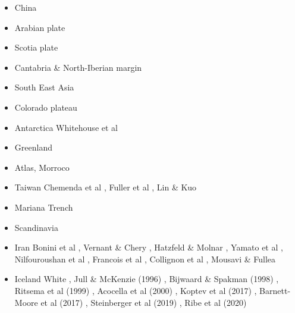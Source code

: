 \begin{itemize}
\item China 
{\scriptsize
\cite{zhst10}
\cite{wazh15}
\cite{guyr16}
\cite{dawl20}
}
\item Arabian plate 
{\scriptsize
\cite{rerl15}
}
\item Scotia plate 
{\scriptsize
\cite{necb13}
\cite{vaga20}
}
\item Cantabria \& North-Iberian margin 
{\scriptsize
\cite{clbb02}
\cite{peap15}
}
\item South East Asia 
{\scriptsize
\cite{rekv04}
\cite{yotr15}\cite{hasp15}\cite{meds15}
\cite{necg16}
}
\item Colorado plateau 
{\scriptsize
\cite{vabv10}
\cite{lesm11}
}
\item Antarctica  
{\scriptsize
\cite{huha07}
Whitehouse et al \cite{whbl12}
}
\item Greenland  
{\scriptsize
\cite{stsj15}\cite{heps15}\cite{stbl19}
}
\item Atlas, Morroco  
{\scriptsize
\cite{mica12}
\cite{kava14}
}
\item Taiwan  
{\scriptsize
Chemenda et al \cite{chys01}, Fuller et al \cite{fuwf06}, Lin \& Kuo \cite{liku16}
}
\item Mariana Trench  
{\scriptsize
\cite{zhlb15}
}
\item Scandinavia  
{\scriptsize
\cite{ramb80}
\cite{bovc14}
}
\item Iran
{\scriptsize
Bonini et al \cite{bocs03},
Vernant \&  Chery \cite{vech06},
Hatzfeld \& Molnar \cite{hamo10},
Yamato et al \cite{yakm11},
Nilfouroushan et al \cite{nipc13},
Francois et al \cite{frba14},
Collignon et al \cite{coyc16},
Mousavi \& Fullea \cite{mofu20}
} 

\item Iceland
{\scriptsize
White \cite{whit89},
Jull \& McKenzie (1996) \cite{jumc96},
Bijwaard \& Spakman  (1998) \cite{bisp98},
Ritsema et al (1999) \cite{rivw99},
Acocella et al  (2000) \cite{acgf00},
Koptev et al (2017) \cite{kocb17},
Barnett-Moore et al (2017) \cite{bahf17},
Steinberger et al (2019) \cite{stbl19},
Ribe et al (2020) \cite{rits20}
} 




\end{itemize}






